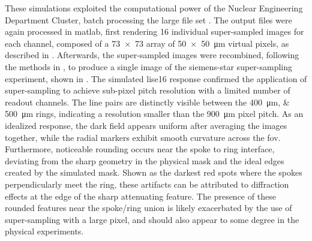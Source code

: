 \documentclass[../../../main.tex]{subfiles}
\begin{document}
    These simulations exploited the computational power of the Nuclear Engineering Department Cluster, batch processing the large file set \cite{website:NECluster}.
    The output files were again processed in \gls{matlab}, first rendering 16 individual \gls{super-sampled} images for each channel, composed of a \num{73 x 73} array of \SI{50 x 50}{\micro\meter} virtual pixels, as described in .
    Afterwards, the \gls{super-sampled} images were recombined, following the methods in , to produce a single image of the \gls{siemens-star} \gls{super-sampling} experiment, shown in .
    The simulated \gls{lise16} response confirmed the application of \gls{super-sampling} to achieve sub-pixel pitch resolution with a limited number of readout channels.
    The line pairs are distinctly visible between the \SIlist{400;500}{\micro\meter} rings, indicating a resolution \Xmath{2.25\times} smaller than the \SI{900}{\micro\meter} pixel pitch.
    As an idealized response, the dark field appears uniform after averaging the images together, while the radial markers exhibit smooth curvature across the \gls{fov}.
    Furthermore, noticeable rounding occurs near the spoke to ring interface, deviating from the sharp geometry in the physical mask and the ideal edges created by the simulated mask.
    Shown as the darkest red spots where the spokes perpendicularly meet the ring, these artifacts can be attributed to diffraction effects at the edge of the sharp attenuating feature.
    The presence of these rounded features near the spoke/ring union is likely exacerbated by the use of \gls{super-sampling} with a large pixel, and should also appear to some degree in the physical experiments.
\end{document}
